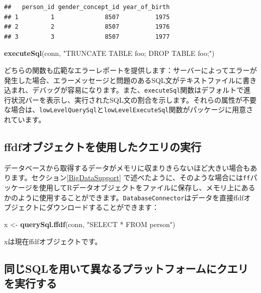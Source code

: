 \documentclass[
  11pt]{book}
\newenvironment{Shaded}{\begin{snugshade}}{\end{snugshade}}
\newcommand{\FunctionTok}[1]{\textcolor[rgb]{0.13,0.29,0.53}{\textbf{#1}}}
\newcommand{\NormalTok}[1]{#1}
\newcommand{\OtherTok}[1]{\textcolor[rgb]{0.56,0.35,0.01}{#1}}
\newcommand{\StringTok}[1]{\textcolor[rgb]{0.31,0.60,0.02}{#1}}
\theoremstyle{definition}
\theoremstyle{definition}
\theoremstyle{definition}
\theoremstyle{definition}
\theoremstyle{remark}
\begin{document}
\begin{verbatim}
##   person_id gender_concept_id year_of_birth
## 1         1              8507          1975
## 2         2              8507          1976
## 3         3              8507          1977
\end{verbatim}

\begin{Shaded}
\begin{Highlighting}[]
\FunctionTok{executeSql}\NormalTok{(conn, }\StringTok{"TRUNCATE TABLE foo; DROP TABLE foo;"}\NormalTok{)}
\end{Highlighting}
\end{Shaded}

どちらの関数も広範なエラーレポートを提供します：サーバーによってエラーが発生した場合、エラーメッセージと問題のあるSQL文がテキストファイルに書き込まれ、デバッグが容易になります。また、\texttt{executeSql}関数はデフォルトで進行状況バーを表示し、実行されたSQL文の割合を示します。それらの属性が不要な場合は、\texttt{lowLevelQuerySql}と\texttt{lowLevelExecuteSql}関数がパッケージに用意されています。

\subsection{ffdfオブジェクトを使用したクエリの実行}\label{ffdfux30aaux30d6ux30b8ux30a7ux30afux30c8ux3092ux4f7fux7528ux3057ux305fux30afux30a8ux30eaux306eux5b9fux884c}

データベースから取得するデータがメモリに収まりきらないほど大きい場合もあります。セクション\ref{BigDataSupport} で述べたように、そのような場合には\texttt{ff}パッケージを使用してRデータオブジェクトをファイルに保存し、メモリ上にあるかのように使用することができます。\texttt{DatabaseConnector}はデータを直接ffdfオブジェクトにダウンロードすることができます：

\begin{Shaded}
\begin{Highlighting}[]
\NormalTok{x }\OtherTok{\textless{}{-}} \FunctionTok{querySql.ffdf}\NormalTok{(conn, }\StringTok{"SELECT * FROM person"}\NormalTok{)}
\end{Highlighting}
\end{Shaded}

xは現在ffdfオブジェクトです。

\subsection{同じSQLを用いて異なるプラットフォームにクエリを実行する}\label{ux540cux3058sqlux3092ux7528ux3044ux3066ux7570ux306aux308bux30d7ux30e9ux30c3ux30c8ux30d5ux30a9ux30fcux30e0ux306bux30afux30a8ux30eaux3092ux5b9fux884cux3059ux308b}
\end{document}
